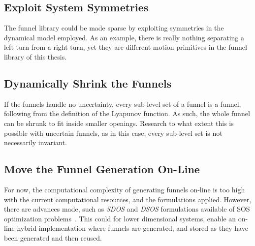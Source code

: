 \subsection{Exploit System Symmetries}

The funnel library could be made sparse by exploiting symmetries in the
dynamical model employed. As an example, there is really nothing separating a
left turn from a right turn, yet they are different motion primitives in the
funnel library of this thesis.

\subsection{Dynamically Shrink the Funnels}

If the funnels handle no uncertainty, every sub-level set of a funnel is a
funnel, following from the definition of the Lyapunov function. As such, the whole funnel can be shrunk to fit inside smaller
openings. Research to what extent this is possible with uncertain funnels, as in
this case, every sub-level set is not necessarily invariant.

\subsection{Move the Funnel Generation On-Line}

For now, the computational complexity of generating funnels on-line is too high
with the current computational resources, and the formulations applied. However,
there are advances made, such as \textit{SDOS} and \textit{DSOS} formulations
available of \ac{SOS} optimization problems~\cite{ahmadi2014dsos}. This could
for lower dimensional systems, enable an on-line hybrid implementation where
funnels are generated, and stored as they have been generated and then reused.




